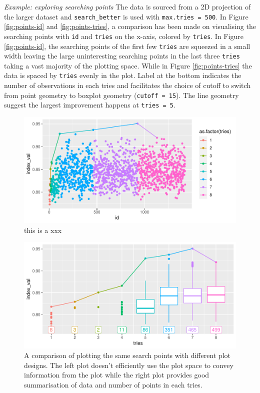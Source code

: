 \documentclass[12pt]{article}
\begin{document}
\emph{Example: exploring searching points} The data is sourced from a 2D
projection of the larger dataset and \texttt{search\_better} is used
with \texttt{max.tries\ =\ 500}. In Figure \ref{fig:points-id} and
\ref{fig:points-tries}, a comparison has been made on visualising the
searching points with \texttt{id} and \texttt{tries} on the x-axis,
colored by \texttt{tries}. In Figure \ref{fig:points-id}, the searching
points of the first few \texttt{tries} are squeezed in a small width
leaving the large uninteresting searching points in the last three
\texttt{tries} taking a vast majority of the plotting space. While in
Figure \ref{fig:points-tries} the data is spaced by \texttt{tries}
evenly in the plot. Label at the bottom indicates the number of
observations in each tries and facilitates the choice of cutoff to
switch from point geometry to boxplot geometry (\texttt{cutoff\ =\ 15}).
The line geometry suggest the largest improvement happens at
\texttt{tries\ =\ 5}.

\begin{figure}
\centering
\includegraphics{paper_files/figure-latex/points-id-1.pdf}
\caption{\label{points-id}this is a xxx}
\end{figure}

\begin{figure}
\centering
\includegraphics{paper_files/figure-latex/points-tries-1.pdf}
\caption{\label{points}A comparison of plotting the same search points
with different plot designs. The left plot doesn't efficiently use the
plot space to convey information from the plot while the right plot
provides good summarisation of data and number of points in each tries.}
\end{figure}
\end{document}
